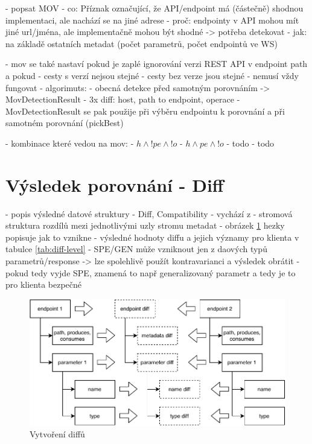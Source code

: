 \documentclass[czech,DP]{thesiskiv}
\begin{document}
- popsat MOV
- co: Příznak označující, že API/endpoint má (částečně) shodnou implementaci, ale nachází se na jiné adrese
- proč: endpointy v API mohou mít jiné url/jména, ale implementačně mohou být shodné -> potřeba detekovat
- jak: na základě ostatních metadat (počet parametrů, počet endpointů ve WS)

- mov se také nastaví pokud je zaplé ignorování verzi REST API v endpoint path a pokud 
	- cesty s verzí nejsou stejné
	- cesty bez verze jsou stejné
- nemusí vždy fungovat
- algorimuts:
	- obecná detekce před samotným porovnáním -> MovDetectionResult
		- 3x diff: host, path to endpoint, operace
	- MovDetectionResult se pak použije při výběru endpointu k porovnání a při samotném porovnání (pickBest)
	
- kombinace které vedou na mov: 
	- $h \land !pe \land !o$
	- $h \land pe \land !o$
	- todo
	- todo
	
	
\section{Výsledek porovnání - Diff}	
- popis výsledné datové struktury
	- Diff, Compatibility
	- vychází z \cite{brada2006diff}
	- stromová struktura rozdílů mezi jednotlivými uzly stromu metadat
	- obrázek \ref{fig:diff-construction} hezky popisuje jak to vznikne
	- výsledné hodnoty diffu a jejich významy pro klienta v tabulce \ref{tab:diff-level}
		- SPE/GEN může vzniknout jen z daových typů parametrů/response -> lze spolehlivě použít kontravarianci a výsledek obrátit
		- pokud tedy vyjde SPE, znamená to např generalizovaný parametr a tedy je to pro klienta bezpečné
	
\begin{figure}[h]
	\centering
	\includegraphics{diff-construction}
	\caption{Vytvoření diffů}
	\label{fig:diff-construction}
\end{figure}
\end{document}
